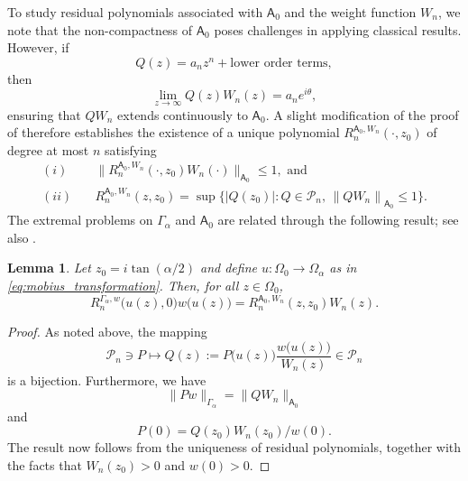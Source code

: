 \documentclass[12pt,oneside,reqno]{amsart}
\newtheorem{lemma}[theorem]{Lemma}
\theoremstyle{definition}
\numberwithin{equation}{section}
\newcommand{\sfA}{\mathsf{A}}
\newcommand{\cP}{{\mathcal{P}}}
\begin{document}
To study residual polynomials associated with $\sfA_0$ and the weight function $W_n$, we note that the non-compactness of $\sfA_0$ poses challenges in applying classical results. However, if 
\[Q(z) = a_nz^{n}+\text{lower order terms},\]
then
\[\lim_{z\rightarrow \infty}Q(z)W_n(z) = a_ne^{i\theta},\]
ensuring that $QW_n$ extends continuously to $\sfA_0$. A slight modification of the proof of \cite[Theorem 2.1]{christiansen-simon-zinchenko-V} therefore establishes the existence of a unique polynomial $R_n^{\sfA_0,W_n}(\cdot,z_0)$ of degree at most $n$ satisfying
\begin{align*} 
   (i)& \quad %
    \|R_n^{\sfA_0,W_n}(\cdot,z_0)W_n(\cdot)\|_{\sfA_0} \leq 1, 
   \mbox{ and }  \\
   (ii)& \quad R_n^{\sfA_0,W_n}(z,z_0)= \sup\bigl\{|Q(z_0)|: Q\in \cP_n,\, \left\|QW_n\right\|_{\sfA_0}\leq 1\bigr\}.
\end{align*}
The extremal problems on %
$\Gamma_\alpha$ and $\sfA_0$ are related through the following result; see also \cite[Lemma 2.1]{eichinger17}.
\begin{lemma}
\label{lem:identification}
	Let $z_0 = i\tan(\alpha/2)$ and define $u:\Omega_0\rightarrow \Omega_\alpha$ as in \eqref{eq:mobius_transformation}. Then, for all $z\in \Omega_0$,
	\begin{equation}
	   R_{n}^{\Gamma_\alpha, w}\bigl(u(z), 0\bigr)w\bigl(u(z)\bigr)= R_{n}^{\sfA_0, W_n}(z,z_0)W_n(z). 
	\end{equation}	
\end{lemma}
\begin{proof}
	As noted above, the mapping
	\[\cP_n\ni P\mapsto Q(z):=P\bigl(u(z)\bigr)\frac{w\bigl(u(z)\bigr)}{W_n(z)}\in \cP_n\] 
	is a bijection. Furthermore, we have	
	\[\|Pw\|_{\Gamma_\alpha} = \|QW_n\|_{\sfA_0}\]
	and
	\[P(0) = Q(z_0)W_n(z_0)/w(0).\]
	The result now follows from the uniqueness of residual polynomials, together with the facts that $W_n(z_0)>0$ and $w(0)>0$.
\end{proof}
\end{document}
